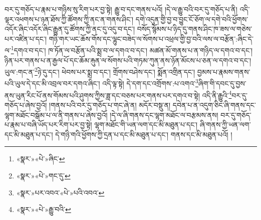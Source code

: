 བར་དུ་གཅོད་པ་རྣམ་པ་གཉིས་སུ་རིག་པར་བྱ་སྟེ། རྒྱུ་བ་དང་གནས་པའོ། །དེ་ལ་རྒྱུ་བའི་བར་དུ་གཅོད་པ་ནི། འདི་ལྟར་འཕགས་པ་ཉན་ཐོས་ཀྱི་ཚོགས་ཀྱི་ནང་ན་གནས་ཤིང་། དགེ་འདུན་གྱི་བྱ་བ་བྱུང་ངོ་ཅོག་ལ་དགེ་བའི་ཕྱོགས་འདོར་ཞིང་འདོར་ཞིང་རྒྱུན་དུ་ཚོགས་ཀྱི་ནང་དུ་འདུ་བ་དང་། བསོད་སྙོམས་པ་ཉིད་དུ་གནས་ཤིང་ཁ་ཟས་ལ་གཅེས་པར་འཛིན་པ་དང་། གཉི་གར་ཡང་ཆོས་གོས་དང་ལྷུང་བཟེད་ལ་སོགས་པ་འཕྲལ་གྱི་བྱ་བའི་ལས་ལ་བརྩོན་:ཞིང་དེ་ལ་\footnote{«སྣར་»«པེ་»ཞིང་}དགའ་བ་དང་། ཁ་ཏོན་ལ་བརྩོན་པའི་སྨྲ་བ་ལ་དགའ་བ་དང་། མཚན་མོ་གནས་པ་ན་གཉིད་ལ་དགའ་བ་དང་། ཉིན་པར་གནས་པ་ན་རྒྱལ་པོ་དང་ཆོམ་རྐུན་ལ་སོགས་པའི་གཏམ་ཀུན་ནས་ཉོན་མོངས་པ་ཅན་ལ་དགའ་བ་དང་། ཡུལ་:གང་ན་\footnote{«སྣར་»«པེ་»གང་དུ་}ཉེ་དུ་དང་། ཕེབས་པར་སྨྲ་བ་དང་། གྲོགས་བཤེས་དང་། སྨོན་འགྲིན་དང་། བྱམས་པ་རྣམས་གནས་པའི་ཡུལ་དེ་དང་མི་འབྲལ་བར་དགའ་ཞིང་། འདི་ལྟ་སྟེ། དེ་དག་དང་འགྲོགས་:པ་འགའ་\footnote{«སྣར་»པར་འབའ་«པེ་»པའི་འབའ་}ཞིག་གི་དབང་དུ་བྱས་ནས་ཡུན་རིང་པོ་ནས་གོམས་པའི་ཤུགས་ཀྱིས་ཟླ་དང་བཅས་པར་གནས་པར་དགའ་བ་སྟེ། འདི་ནི་རྒྱུའི་\footnote{«སྣར་»«པེ་»རྒྱུ་བའི་}བར་དུ་གཅོད་པ་ཞེས་བྱའོ། །གནས་པའི་བར་དུ་གཅོད་པ་གང་ཞེ་ན། མདོར་བསྡུ་ན། དབེན་པ་ན་འདུག་ཅིང་ཞི་གནས་དང་ལྷག་མཐོང་བསྒོམ་པ་ལ་ནི་གནས་པ་ཞེས་བྱའོ། །དེ་ལ་ཞི་གནས་དང་ལྷག་མཐོང་ལ་བརྩམས་ནས། བར་དུ་གཅོད་པ་རྣམ་པ་བཞི་ཡོད་པར་རིག་པར་བྱ་སྟེ། ལྷག་མཐོང་གི་ཡན་ལག་དང་མི་མཐུན་པ་དང་། ཞི་གནས་ཀྱི་ཡན་ལག་དང་མི་མཐུན་པ་དང་། དེ་གཉི་གའི་ཕྱོགས་ཀྱི་དྲན་པ་དང་མི་མཐུན་པ་དང་། གནས་དང་མི་མཐུན་པའོ། །
